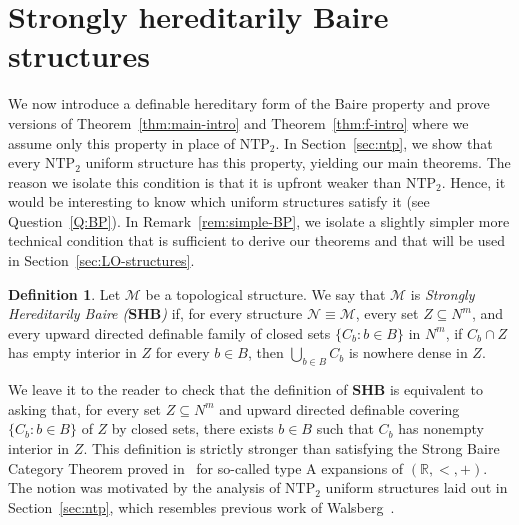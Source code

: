 \documentclass[12pt]{article}
\newcommand{\Mm}{\mathcal{M}}
\newcommand{\Nn}{\mathcal{N}}
\newcommand{\BP}{\textbf{SHB}}
\newcommand{\R}{\mathbb{R}}
\newcommand{\NTP}{\ensuremath{\mathrm{NTP}_2}}
\theoremstyle{definition}
\newtheorem{definition}[theorem]{Definition}
\theoremstyle{remark}
\begin{document}
\section{Strongly hereditarily Baire structures} \label{sec:BP}


We now introduce a definable hereditary form of the Baire property and prove versions of Theorem~\ref{thm:main-intro} and Theorem~\ref{thm:f-intro} where we assume only this property in place of $\NTP$. In Section~\ref{sec:ntp}, we show that every $\NTP$ uniform structure has this property, yielding our main theorems. The reason we isolate this condition is that it is upfront weaker than $\NTP$. Hence, it would be interesting to know which uniform structures satisfy it (see Question~\ref{Q:BP}). In Remark~\ref{rem:simple-BP}, we isolate a slightly simpler more technical condition that is sufficient to derive our theorems and that will be used in Section~\ref{sec:LO-structures}. 

\begin{definition}
Let $\Mm$ be a topological structure. We say that $\Mm$ is \emph{Strongly Hereditarily Baire ($\BP$)} if, for every structure $\Nn\equiv \Mm$, every set $Z\subseteq N^m$, and every upward directed definable family of closed sets $\{ C_b : b\in B\}$ in $N^m$, if $C_b\cap Z$ has empty interior in $Z$ for every $b\in B$, then $\bigcup_{b\in B} C_b$ is nowhere dense in $Z$. 
\end{definition}

We leave it to the reader to check that the definition of $\BP$ is equivalent to asking that, for every set $Z\subseteq N^m$ and upward directed definable covering $\{C_b : b\in B\}$ of $Z$ by closed sets, there exists $b\in B$ such that $C_b$ has nonempty interior in $Z$. This definition is strictly stronger than satisfying the Strong Baire Category Theorem proved in~\cite{comp-set} for so-called type A expansions of $(\R,<,+)$. The notion was motivated by the analysis of $\NTP$ uniform structures laid out in Section~\ref{sec:ntp}, which resembles previous work of Walsberg~\cite{Wal22}.  
\end{document}
